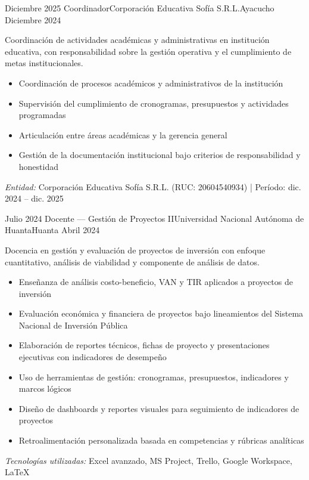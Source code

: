 \begin{experiences}
\experience
{Diciembre 2025} {Coordinador}{Corporación Educativa Sofía S.R.L.}{Ayacucho}
{Diciembre 2024} {
	Coordinación de actividades académicas y administrativas en institución educativa, con responsabilidad sobre la gestión operativa y el cumplimiento de metas institucionales.
	\begin{itemize}
		\item Coordinación de procesos académicos y administrativos de la institución
		\item Supervisión del cumplimiento de cronogramas, presupuestos y actividades programadas
		\item Articulación entre áreas académicas y la gerencia general
		\item Gestión de la documentación institucional bajo criterios de responsabilidad y honestidad
	\end{itemize}
}
{\footnotesize{\emph{Entidad:} Corporación Educativa Sofía S.R.L. (RUC: 20604540934) | Período: dic. 2024 -- dic. 2025}}
\emptySeparator


\experience
{Julio 2024} {Docente — Gestión de Proyectos II}{Universidad Nacional Autónoma de Huanta}{Huanta}
{Abril 2024} {
	Docencia en gestión y evaluación de proyectos de inversión con enfoque cuantitativo, análisis de viabilidad y componente de análisis de datos.
	\begin{itemize}
		\item Enseñanza de análisis costo-beneficio, VAN y TIR aplicados a proyectos de inversión
		\item Evaluación económica y financiera de proyectos bajo lineamientos del Sistema Nacional de Inversión Pública
		\item Elaboración de reportes técnicos, fichas de proyecto y presentaciones ejecutivas con indicadores de desempeño
		\item Uso de herramientas de gestión: cronogramas, presupuestos, indicadores y marcos lógicos
		\item Diseño de dashboards y reportes visuales para seguimiento de indicadores de proyectos
		\item Retroalimentación personalizada basada en competencias y rúbricas analíticas
	\end{itemize}
}
{\footnotesize{\emph{Tecnologías utilizadas:} Excel avanzado, MS Project, Trello, Google Workspace, LaTeX}}
\emptySeparator


\end{experiences}
